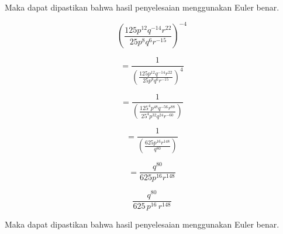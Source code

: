 \documentclass[a4paper,10pt]{article}
\begin{document}
\begin{eulernotebook}
\begin{eulercomment}
\begin{eulercomment}
\begin{eulercomment}
\begin{eulercomment}
\begin{eulercomment}
\begin{eulercomment}
\begin{eulercomment}
\begin{eulercomment}
\begin{eulercomment}
\begin{eulercomment}
\begin{eulercomment}
\begin{eulercomment}
\begin{eulerformula}
\[\]
\end{eulerformula}
\begin{eulercomment}
Maka dapat dipastikan bahwa hasil penyelesaian menggunakan Euler
benar.
\end{eulercomment}
\begin{eulercomment}


\end{eulercomment}
\begin{eulercomment}
\end{eulercomment}
\begin{eulerformula}
\[
\left (\frac {125 p^{12} q^{-14} r^{22}} {25 p^8 q^6 r^{-15}} \right)^{-4}
\]
\end{eulerformula}
\begin{eulercomment}
\end{eulercomment}
\begin{eulerformula}
\[
= \frac {1} {\left (\frac {125 p^{12} q^{-14} r^{22}} {25 p^8 q^6 r^{-15}} \right)^4}
\]
\end{eulerformula}
\begin{eulercomment}
\end{eulercomment}
\begin{eulerformula}
\[
= \frac {1} {\left (\frac {125^4 p^{48} q^{-56} r^{88}} {25^4 p^{32} q^{24} r^{-60}} \right)}
\]
\end{eulerformula}
\begin{eulercomment}
\end{eulercomment}
\begin{eulerformula}
\[
= \frac {1} {\left (\frac {625 p^{16} r^{148}} {q^{80}} \right)}
\]
\end{eulerformula}
\begin{eulercomment}
\end{eulercomment}
\begin{eulerformula}
\[
= \frac {q^{80}} {625 p^{16} r^{148}}
\]
\end{eulerformula}
\begin{eulerformula}
\[
\frac{q^{80}}{625\,p^{16}\,r^{148}}
\]
\end{eulerformula}
\begin{eulercomment}
Maka dapat dipastikan bahwa hasil penyelesaian menggunakan Euler
benar.
\end{eulercomment}
\begin{eulercomment}



\end{eulercomment}
\end{eulercomment}
\end{eulercomment}
\end{eulercomment}
\end{eulercomment}
\end{eulercomment}
\end{eulercomment}
\end{eulercomment}
\end{eulercomment}
\end{eulercomment}
\end{eulercomment}
\end{eulercomment}
\end{eulercomment}
\end{eulernotebook}
\end{document}
